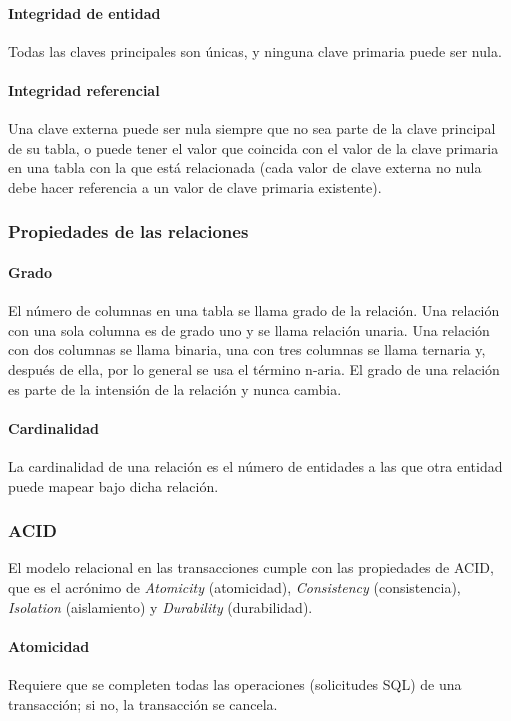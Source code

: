 \paragraph*{Integridad de entidad}
Todas las claves principales son únicas, y ninguna clave primaria puede ser nula.
\paragraph*{Integridad referencial}
Una clave externa puede ser nula siempre que no sea parte de la clave principal de su tabla, o puede tener el valor que coincida con el valor de la clave primaria en una tabla con la que está relacionada (cada valor de clave externa no nula debe hacer referencia a un valor de clave primaria existente).

\subsubsection{Propiedades de las relaciones}
\paragraph*{Grado}
El número de columnas en una tabla se llama grado de la relación. Una relación con una sola columna es de grado uno y se llama relación unaria. Una relación con dos columnas se llama binaria, una con tres columnas se llama ternaria y, después de ella, por lo general se usa el término n-aria. El grado de una relación es parte de la intensión de la relación y nunca cambia.


\paragraph*{Cardinalidad}
La cardinalidad de una relación es el número de entidades a las que otra entidad puede mapear bajo dicha relación.

\subsubsection{ACID}
El modelo relacional en las transacciones cumple con las propiedades de ACID, que es el acrónimo de \textit{Atomicity} (atomicidad), \textit{Consistency} (consistencia), \textit{Isolation} (aislamiento) y \textit{Durability} (durabilidad). 

\paragraph*{Atomicidad}
Requiere que se completen todas las operaciones (solicitudes SQL) de una transacción;
si no, la transacción se cancela. 


